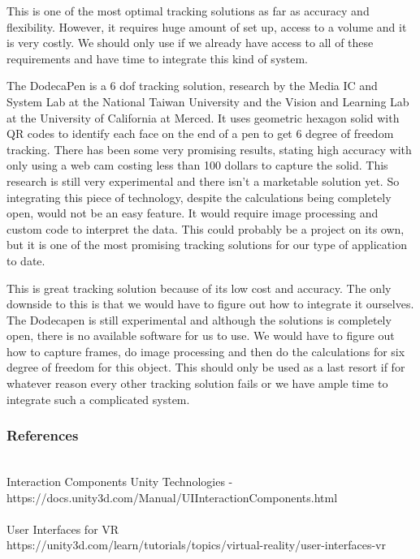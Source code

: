 \documentclass[onecolumn, draftclsnofoot,10pt, compsoc]{IEEEtran}
\newcounter{threesection}[subsubsection]
\begin{document}
This is one of the most optimal tracking solutions as far as accuracy and flexibility. However, it requires huge amount of set up, access to a volume and it is very costly. We should only use if we already have access to all of these requirements and have time to integrate this kind of system. 

The DodecaPen is a 6 dof tracking solution, research by the Media IC and System Lab at the National Taiwan University and the Vision and Learning Lab at the University of California at Merced. It uses geometric hexagon solid with QR codes to identify each face on the end of a pen to get 6 degree of freedom tracking. There has been some very promising results, stating high accuracy with only using a web cam costing less than 100 dollars to capture the solid. This research is still very experimental and there isn't a marketable solution yet. So integrating this piece of technology, despite the calculations being completely open, would not be an easy feature. It would require image processing and custom code to interpret the data. This could probably be a project on its own, but it is one of the most promising tracking solutions for our type of application to date. 

This is great tracking solution because of its low cost and accuracy. The only downside to this is that we would have to figure out how to integrate it ourselves. The Dodecapen is still experimental and although the solutions is completely open, there is no available software for us to use. We would have to figure out how to capture frames, do image processing and then do the calculations for six degree of freedom for this object. This should only be used as a last resort if for whatever reason every other tracking solution fails or we have ample time to integrate such a complicated system.

\newpage
\subsubsection{References}
~\\ 
Interaction Components Unity Technologies - \\
https://docs.unity3d.com/Manual/UIInteractionComponents.html \\ \\

User Interfaces for VR\\
https://unity3d.com/learn/tutorials/topics/virtual-reality/user-interfaces-vr\\ \\
\end{document}
